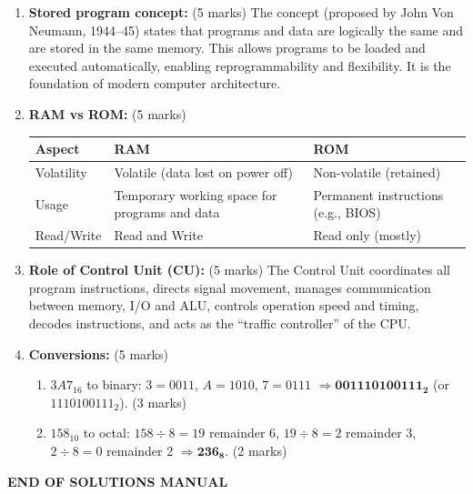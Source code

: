 \documentclass[12pt]{article}
\begin{document}
\begin{enumerate}[label=(\alph*)]
    \item \textbf{Stored program concept:} \hfill (5 marks)
    The concept (proposed by John Von Neumann, 1944--45) states that programs and data are logically the same and are stored in the same memory. This allows programs to be loaded and executed automatically, enabling reprogrammability and flexibility. It is the foundation of modern computer architecture.

    \item \textbf{RAM vs ROM:} \hfill (5 marks)

    \begin{center}
    \begin{tabular}{|p{3.5cm}|p{5cm}|p{5cm}|}
        \hline
        \textbf{Aspect} & \textbf{RAM} & \textbf{ROM} \\
        \hline
        Volatility & Volatile (data lost on power off) & Non-volatile (retained) \\
        Usage & Temporary working space for programs and data & Permanent instructions (e.g., BIOS) \\
        Read/Write & Read and Write & Read only (mostly) \\
        \hline
    \end{tabular}
    \end{center}

    \item \textbf{Role of Control Unit (CU):} \hfill (5 marks)
    The Control Unit coordinates all program instructions, directs signal movement, manages communication between memory, I/O and ALU, controls operation speed and timing, decodes instructions, and acts as the ``traffic controller'' of the CPU.

    \item \textbf{Conversions:} \hfill (5 marks)
    \begin{enumerate}
        \item $3A7_{16}$ to binary: $3 = 0011$, $A = 1010$, $7 = 0111$ $\Rightarrow \mathbf{001110100111_2}$ (or $1110100111_2$). \hfill (3 marks)
        \item $158_{10}$ to octal: $158 \div 8 = 19$ remainder 6, $19 \div 8 = 2$ remainder 3, $2 \div 8 = 0$ remainder 2 $\Rightarrow \mathbf{236_8}$. \hfill (2 marks)
    \end{enumerate}
\end{enumerate}

\vspace{1cm}
\begin{center}
    \textbf{END OF SOLUTIONS MANUAL}
\end{center}
\end{document}
